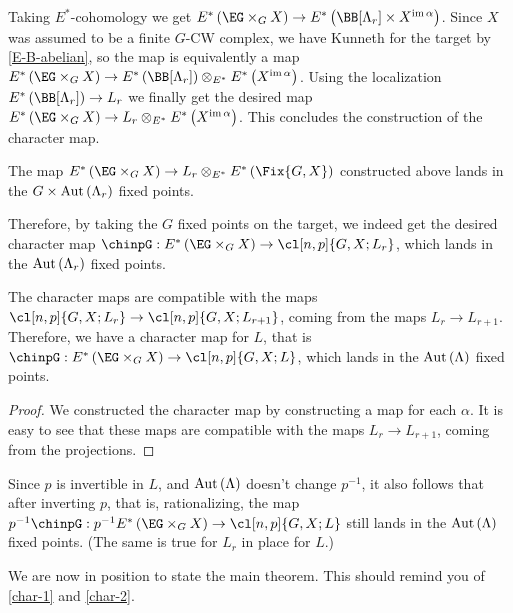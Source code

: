 Taking $E^*$-cohomology we get $E^*\left(\EG \times_G X\right) \to E^*\left(\BB[\Lambda_r] \times X^{\im \alpha}\right)$.
Since $X$ was assumed to be a finite $G$-CW complex, we have Kunneth for the target by \ref{E-B-abelian}, so the map is equivalently a map $E^*\left(\EG \times_G X\right) \to E^*\left(\BB[\Lambda_r]\right) \otimes_{E^*} E^*\left(X^{\im \alpha}\right)$.
Using the localization $E^*\left(\BB[\Lambda_r]\right) \to L_r$ we finally get the desired map $E^*\left(\EG \times_G X\right) \to L_r \otimes_{E^*} E^*\left(X^{\im \alpha}\right)$.
This concludes the construction of the character map.

\begin{proposition}
	The map $E^*\left(\EG \times_G X\right) \to L_r \otimes_{E^*} E^*\left(\Fix{G,X}\right)$ constructed above lands in the $G \times \operatorname{Aut} \left(\Lambda_r\right)$ fixed points.
\end{proposition}

Therefore, by taking the $G$ fixed points on the target, we indeed get the desired character map $\chinpG: E^*\left(\EG \times_G X\right) \to \cl[n,p]{G,X; L_r}$, which lands in the $\operatorname{Aut} \left(\Lambda_r\right)$ fixed points.

\begin{proposition}
	The character maps are compatible with the maps $\cl[n,p]{G,X; L_r} \to \cl[n,p]{G,X; L_{r+1}}$, coming from the maps $L_r \to L_{r+1}$.
	Therefore, we have a character map for $L$, that is $\chinpG: E^*\left(\EG \times_G X\right) \to \cl[n,p]{G,X; L}$, which lands in the $\operatorname{Aut} \left(\Lambda\right)$ fixed points.
\end{proposition}

\begin{proof}
	We constructed the character map by constructing a map for each $\alpha$.
	It is easy to see that these maps are compatible with the maps $L_r \to L_{r+1}$, coming from the projections.
\end{proof}

Since $p$ is invertible in $L$, and $\operatorname{Aut} \left(\Lambda\right)$ doesn't change $p^{-1}$, it also follows that after inverting $p$, that is, rationalizing, the map $p^{-1} \chinpG: p^{-1} E^*\left(\EG \times_G X\right) \to \cl[n,p]{G,X; L}$ still lands in the $\operatorname{Aut} \left(\Lambda\right)$ fixed points.
(The same is true for $L_r$ in place for $L$.)

We are now in position to state the main theorem.
This should remind you of \ref{char-1} and \ref{char-2}.

